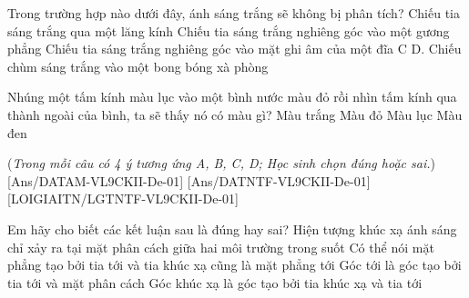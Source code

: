 \begin{ex}
	Trong trường hợp nào dưới đây, ánh sáng trắng sẽ không bị phân tích?
	\choice
	{Chiếu tia sáng trắng qua một lăng kính}
	{\True Chiếu tia sáng trắng nghiêng góc vào một gương phẳng}
	{Chiếu tia sáng trắng nghiêng góc vào mặt ghi âm của một đĩa C}
	{D. Chiếu chùm sáng trắng vào một bong bóng xà phòng}
	\loigiai{}
\end{ex}

\begin{ex}
	Nhúng một tấm kính màu lục vào một bình nước màu đỏ rồi nhìn tấm kính qua thành ngoài của bình, ta sẽ thấy nó có màu gì?
	\choice
	{Màu trắng}
	{Màu đỏ}
	{Màu lục}
	{\True Màu đen}
	\loigiai{}
\end{ex}




(\textit{Trong mỗi câu có 4 ý tương ứng A, B, C, D; Học sinh chọn đúng hoặc sai.})
[Ans/DATAM-VL9CKII-De-01]
[Ans/DATNTF-VL9CKII-De-01]
\LGexTF
{}[LOIGIAITN/LGTNTF-VL9CKII-De-01]

\begin{ex}
	Em hãy cho biết các kết luận sau là đúng hay sai?
	\choiceTF
	{\True Hiện tượng khúc xạ ánh sáng chỉ xảy ra tại mặt phân cách giữa hai môi trường trong suốt}
	{\True Có thể nói mặt phẳng tạo bởi tia tới và tia khúc xạ cũng là mặt phẳng tới}
	{Góc tới là góc tạo bởi tia tới và mặt phân cách}
	{Góc khúc xạ là góc tạo bởi tia khúc xạ và tia tới}
	\loigiai{}
\end{ex}


